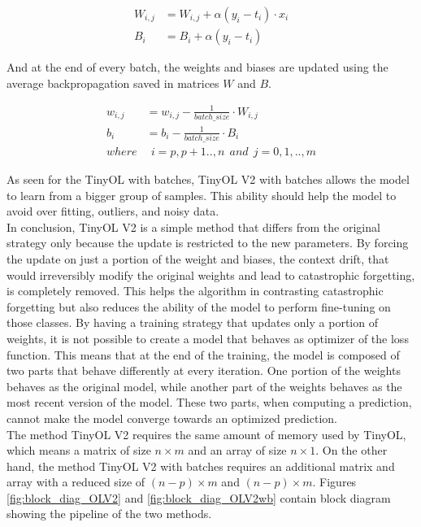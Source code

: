 \documentclass[12pt]{report}
\begin{document}
\begin{align}
    W_{i,j} &= W_{i,j} + \alpha (y_i - t_i) \cdot x_i \\
    B_i     &= B_i + \alpha  (y_i - t_i) 
\end{align}

And at the end of every batch, the weights and biases are updated using the average backpropagation saved in matrices $W$ and $B$.

\begin{align}
    w_{i,j} &= w_{i,j} - \frac{1}{batch\_size} \cdot W_{i,j} \\
    b_i 	    &= b_i - \frac{1}{batch\_size} \cdot B_i \\
    where   & \: \: i= p,p+1..,n  \: \: and \: \:  j=0,1,..,m \nonumber  
\end{align}

As seen for the TinyOL with batches, TinyOL V2 with batches allows the model to learn from a bigger group of samples. This ability should help the model to avoid over fitting, outliers, and noisy data. \\
In conclusion, TinyOL V2 is a simple method that differs from the original strategy only because the update is restricted to the new parameters.  By forcing the update on just a portion of the weight and biases, the context drift, that would irreversibly modify the original weights and lead to catastrophic forgetting, is completely removed. This helps the algorithm in contrasting catastrophic forgetting but also reduces the ability of the model to perform fine-tuning on those classes. By having a training strategy that updates only a portion of weights, it is not possible to create a model that behaves as optimizer of the loss function. This means that at the end of the training, the model is composed of two parts that behave differently at every iteration. One portion of the weights behaves as the original model, while another part of the weights behaves as the most recent version of the model. These two parts, when computing a prediction, cannot make the model converge towards an optimized prediction. \\
The method TinyOL V2 requires the same amount of memory used by TinyOL, which means a matrix of size $n \times m$ and an array of size $n \times 1$. On the other hand, the method TinyOL V2 with batches requires an additional matrix and array with a reduced size of $(n-p) \times m$ and $(n-p) \times m$. Figures \ref{fig:block_diag_OLV2} and \ref{fig:block_diag_OLV2wb} contain block diagram showing the pipeline of the two methods.
\end{document}
